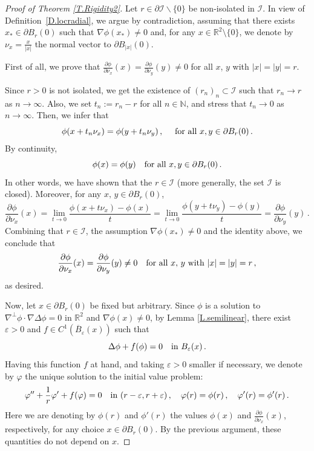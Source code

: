 \documentclass[11pt,oneside]{amsart}
\theoremstyle{definition}
\newcommand{\ep}{\varepsilon}
\newcommand{\vp}{\varphi}
\def\NN{\mathbb{N}}
\def\RR{\mathbb{R}}
\newcommand{\cB}{{\mathcal I}}
\newcommand{\pd}{\partial}
\numberwithin{equation}{section}
\begin{document}
\begin{proof}[Proof of Theorem \ref{T.Rigidity2}] 
    Let $r \in \pd \cB\backslash\{0\}$ be non-isolated in $\cB$. In view of Definition~\ref{D.locradial}, we argue by contradiction, assuming that there exists $x_* \in \pd B_r(0)$ such that $\nabla \phi(x_*) \neq 0$ and,  for any $x \in \RR^2 \setminus \{0\}$, we denote by $\nu_x = \frac{x}{|x|}$ the normal vector to $\partial B_{|x|}(0)$. 

    First of all, we prove that $\frac{\pd \phi}{\pd \nu_x} (x) = \frac{\pd \phi}{\pd \nu_y} (y) \neq 0$ for all $x$, $y$ with $|x|=|y|=r$. 
    
    Since $r > 0$ is not isolated, we get the existence of $(r_n)_n \subset \cB$ such that $r_n \to r$ as $n \to \infty$. Also, we set $t_n := r_n -r$ for all $n \in \NN$, and stress that $t_n \to 0$ as $n \to \infty$. Then, we infer that
    $$
    \phi(x+ t_n \nu_x) = \phi(y + t_n \nu_y)\,, \quad \textup{ for all } x,y \in \pd B_r(0)\,.
    $$
    By continuity,
    $$
    \phi(x) = \phi(y) \quad \textup{for all }x,y \in \pd B_r(0)\,.
    $$ In other words, we have shown that the $ r \in \cB$ (more generally, the set $\cB$ is closed). Moreover, for any $x,\,y \in \pd B_r(0)$,
    $$
    \frac{\pd \phi}{\pd \nu_x} (x) = \lim_{t \to 0} \frac{\phi(x+ t \nu_x)-\phi(x)}{t} = \lim_{t \to 0} \frac{\phi(y+ t \nu_y)-\phi(y)}{t} = \frac{\pd \phi}{\pd \nu_y} (y)\,.
    $$
    Combining that $r \in \cB$, the assumption $\nabla \phi(x_*) \neq 0$ and the identity above, we conclude that
    $$
    \frac{\pd \phi}{\pd \nu_x} (x) = \frac{\pd \phi}{\pd \nu_y} (y) \neq 0 \quad \textup{for all  } x,\, y\textup{ with }|x|=|y|=r\,,
    $$
    as desired.

    Now, let $x \in \pd B_r(0)$ be fixed but arbitrary. Since $\phi$ is a solution to $\nabla^{\perp}\phi \cdot \nabla \Delta \phi = 0$ in $\RR^2$ and $\nabla \phi(x) \neq 0$, by Lemma \ref{L.semilinear}, there exist $\ep > 0$ and $f \in C^1(\overline{B}_\ep(x))$ such that
    $$
    \Delta \phi + f(\phi) = 0 \quad \textup{in } B_\ep (x)\,.
    $$
    Having this function $f$ at hand, and taking $\ep > 0$ smaller if necessary, we denote by $\varphi$ the unique solution to the initial value problem:
    $$
    \varphi'' + \frac{1}{r} \varphi' + f(\varphi) = 0 \quad \textup{in } (r-\ep,r+\ep)\,, \quad \vp(r) = \phi(r)\,, \quad \vp'(r) = \phi'(r)\,.
    $$
    Here we are denoting by $\phi(r)$ and $\phi'(r)$ the values $\phi(x)$ and $\frac{\pd \phi}{\pd \nu_x} (x)$, respectively, for any choice $x \in \partial B_r(0)$. By the previous argument, these quantities do not depend on $x$.
    

\end{proof}
\end{document}
